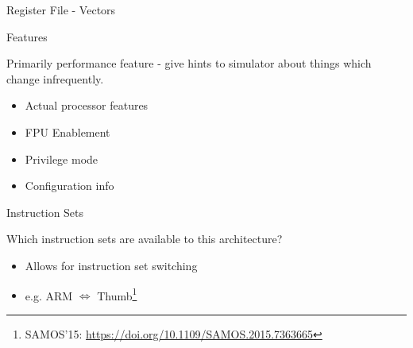 \begin{frame}{Register File - Vectors}
\begin{minipage}[t]{0.95\textwidth}
\begin{block}{}
\usebox{\codeboxtwo}

\end{block}
\end{minipage}

\end{frame}

\begin{frame}{Features}

Primarily performance feature - give hints to simulator about things 
which change infrequently.

\begin{itemize}
\item Actual processor features
\item FPU Enablement
\item Privilege mode
\item Configuration info
\end{itemize}

\end{frame}

\begin{frame}{Instruction Sets}

Which instruction sets are available to this architecture?
\begin{itemize}
\item Allows for instruction set switching
\item e.g. ARM $\Leftrightarrow$ Thumb\footnote{SAMOS'15: \url{https://doi.org/10.1109/SAMOS.2015.7363665}}
\end{itemize}

\end{frame}
